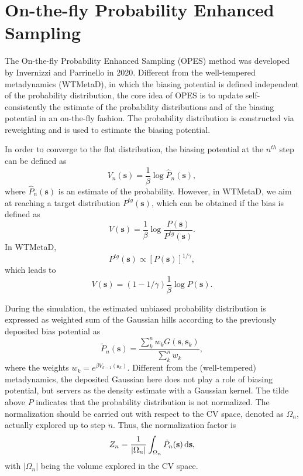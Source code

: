 \section{On-the-f{l}y Probability Enhanced Sampling\label{Sec:ES:OPES}}
The On-the-f{l}y Probability Enhanced Sampling (OPES) method was developed by Invernizzi and Parrinello in 2020.\cite{InvernizziJPCL2020} Different from the well-tempered metadynamics (WTMetaD), in which the biasing potential is defined independent of the probability distribution, the core idea of OPES is to update self-consistently the estimate of the probability distributions and of the biasing potential in an on-the-fly fashion. The probability distribution is constructed via reweighting and is used to estimate the biasing potential.

In order to converge to the flat distribution, the biasing potential at the $n^{th}$ step can be defined as
\begin{equation}
	V_n(\mathbf{s})=\frac{1}{\beta} \log{\hat{P}_n(\mathbf{s})},
\end{equation}
where $\hat{P}_n(\mathbf{s})$ is an estimate of the probability. However, in WTMetaD, we aim at reaching a target distribution $P^{tg}(\mathbf{s})$, which can be obtained if the bias is defined as
\begin{equation}
	V(\mathbf{s})=\frac{1}{\beta} \log{\frac{P(\mathbf{s})}{P^{tg}(\mathbf{s})}}.
\end{equation}
In WTMetaD,
\begin{equation}
	P^{tg}(\mathbf{s})\propto \left[P(\mathbf{s})\right]^{1/\gamma},
\end{equation}
which leads to
\begin{equation}
	V(\mathbf{s})=(1-1/\gamma)\frac{1}{\beta} \log{P(\mathbf{s})}.
\end{equation}

During the simulation, the estimated unbiased probability distribution is expressed as weighted sum of the Gaussian hills according to the previously deposited bias potential as
\begin{equation}
	\tilde{P}_n(\mathbf{s})=\frac{\sum_k^n w_k G(\mathbf{s},\mathbf{s}_k)}{\sum_k^n w_k},
\end{equation}
where the weights $w_k=e^{\beta V_{k-1}(\mathbf{s}_k)}$. Different from the (well-tempered) metadynamics, the deposited Gaussian here does not play a role of biasing potential, but servers as the density estimate with a Gaussian kernel. The tilde above $P$ indicates that the probability distribution is not normalized. The normalization should be carried out with respect to the CV space, denoted as $\Omega_n$, actually explored up to step $n$. Thus, the normalization factor is
\begin{equation}
	Z_n=\frac{1}{|\Omega_n|}\int_{\Omega_n}\tilde{P}_n(\mathbf{s})\mathop{}\!\mathrm{d} \mathbf{s},
\end{equation}
with $|\Omega_n|$ being the volume explored in the CV space.

